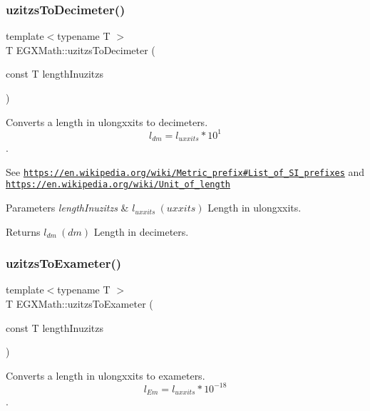 \subsubsection{\texorpdfstring{uzitzs\+To\+Decimeter()}{uzitzsToDecimeter()}}
{\footnotesize\ttfamily template$<$typename T $>$ \\
T E\+G\+X\+Math\+::uzitzs\+To\+Decimeter (\begin{DoxyParamCaption}\item[{const T}]{length\+Inuzitzs }\end{DoxyParamCaption})}



Converts a length in ulongxxits to decimeters. \[ l_{dm}=l_{uxxits} * 10^{1} \]. 

See \href{https://en.wikipedia.org/wiki/Metric_prefix#List_of_SI_prefixes}{\tt https\+://en.\+wikipedia.\+org/wiki/\+Metric\+\_\+prefix\#\+List\+\_\+of\+\_\+\+S\+I\+\_\+prefixes} and \href{https://en.wikipedia.org/wiki/Unit_of_length}{\tt https\+://en.\+wikipedia.\+org/wiki/\+Unit\+\_\+of\+\_\+length} 
\begin{DoxyParams}{Parameters}
{\em length\+Inuzitzs} & $ l_{uxxits}\ (uxxits)$ Length in ulongxxits. \\
\hline
\end{DoxyParams}
\begin{DoxyReturn}{Returns}
$ l_{dm}\ (dm)$ Length in decimeters. 
\end{DoxyReturn}
\mbox{\label{group___e_g_x_math-_conversions-_length_conversions-_non-_s_i-uzitzs-_s_i_ga4c102f14f5804c46db22137411ceb3be}} 
\subsubsection{\texorpdfstring{uzitzs\+To\+Exameter()}{uzitzsToExameter()}}
{\footnotesize\ttfamily template$<$typename T $>$ \\
T E\+G\+X\+Math\+::uzitzs\+To\+Exameter (\begin{DoxyParamCaption}\item[{const T}]{length\+Inuzitzs }\end{DoxyParamCaption})}



Converts a length in ulongxxits to exameters. \[ l_{Em}=l_{uxxits} * 10^{-18} \]. 

